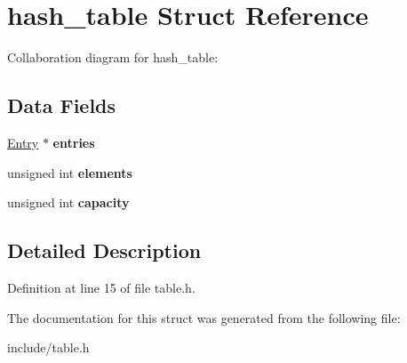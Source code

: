 \hypertarget{structhash__table}{}\section{hash\+\_\+table Struct Reference}
\label{structhash__table}


Collaboration diagram for hash\+\_\+table\+:
\subsection*{Data Fields}
\begin{DoxyCompactItemize}
\item 
\mbox{\label{structhash__table_aab7e2f53e8809fd2ca3dea8904d6fe58}} 
\hyperlink{structentry}{Entry} $\ast$ {\bfseries entries}
\item 
\mbox{\label{structhash__table_ac9d0f5c20510128275cdcb360de992c0}} 
unsigned int {\bfseries elements}
\item 
\mbox{\label{structhash__table_a42d54eb767f361f72639daac1e6b1a33}} 
unsigned int {\bfseries capacity}
\end{DoxyCompactItemize}


\subsection{Detailed Description}


Definition at line 15 of file table.\+h.



The documentation for this struct was generated from the following file\+:\begin{DoxyCompactItemize}
\item 
include/table.\+h\end{DoxyCompactItemize}
